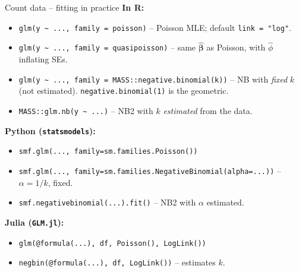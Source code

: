 \documentclass[10pt,ignorenonframetext,aspectratio=169]{beamer}
\begin{document}
\begin{frame}{Count data -- fitting in practice}
\textbf{In R:}
\begin{itemize}
\justifying
    \item \texttt{glm(y \textasciitilde{} ..., family = poisson)} -- Poisson MLE; default \texttt{link = "log"}.
    \item \texttt{glm(y \textasciitilde{} ..., family = quasipoisson)} -- same $\hat{\boldsymbol{\beta}}$ as Poisson, with $\hat{\phi}$ inflating SEs.
    \item \texttt{glm(y \textasciitilde{} ..., family = MASS::negative.binomial(k))} -- NB with \emph{fixed} $k$ (not estimated). \texttt{negative.binomial(1)} is the geometric.
    \item \texttt{MASS::glm.nb(y \textasciitilde{} ...)} -- NB2 with $k$ \emph{estimated} from the data.
\end{itemize}

\medskip
\textbf{Python (\texttt{statsmodels}):}
\begin{itemize}
    \item \texttt{smf.glm(..., family=sm.families.Poisson())}
    \item \texttt{smf.glm(..., family=sm.families.NegativeBinomial(alpha=...))} -- $\alpha = 1/k$, fixed.
    \item \texttt{smf.negativebinomial(...).fit()} -- NB2 with $\alpha$ estimated.
\end{itemize}

\medskip
\textbf{Julia (\texttt{GLM.jl}):}
\begin{itemize}
    \item \texttt{glm(@formula(...), df, Poisson(), LogLink())}
    \item \texttt{negbin(@formula(...), df, LogLink())} -- estimates $k$.
\end{itemize}
\end{frame}





\end{document}
